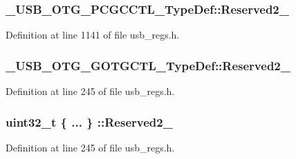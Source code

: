 \hypertarget{group___u_s_b___o_t_g___d_r_i_v_e_r_gabc16bbefeb0572fe4e11610b2b65edf9}{
\subsubsection[{Reserved2\-\_\-3}]{ \-\_\-\-U\-S\-B\-\_\-\-O\-T\-G\-\_\-\-P\-C\-G\-C\-C\-T\-L\-\_\-\-Type\-Def\-::\-Reserved2\-\_}}\label{group___u_s_b___o_t_g___d_r_i_v_e_r_gabc16bbefeb0572fe4e11610b2b65edf9}


Definition at line 1141 of file usb\-\_\-regs.\-h.

\hypertarget{group___u_s_b___o_t_g___d_r_i_v_e_r_ga9821b352087a7b65db3080c50475eba8}{
\subsubsection[{Reserved2\-\_\-7}]{ \-\_\-\-U\-S\-B\-\_\-\-O\-T\-G\-\_\-\-G\-O\-T\-G\-C\-T\-L\-\_\-\-Type\-Def\-::\-Reserved2\-\_}}\label{group___u_s_b___o_t_g___d_r_i_v_e_r_ga9821b352087a7b65db3080c50475eba8}


Definition at line 245 of file usb\-\_\-regs.\-h.

\hypertarget{group___u_s_b___o_t_g___d_r_i_v_e_r_gab10a471c65fdd63460c036d4326f8e85}{
\subsubsection[{Reserved2\-\_\-7}]{\setlength{\rightskip}{0pt plus 5cm}uint32\-\_\-t \{ ... \} \-::Reserved2\-\_}}\label{group___u_s_b___o_t_g___d_r_i_v_e_r_gab10a471c65fdd63460c036d4326f8e85}


Definition at line 245 of file usb\-\_\-regs.\-h.

